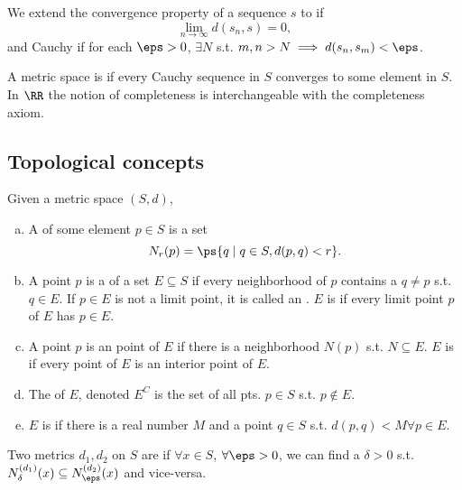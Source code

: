 \documentclass[11pt]{scrartcl}
\numberwithin{equation}{section}
\begin{document}
\begin{definition}
    We extend the convergence property of a sequence $s$ to if 
    \[ \lim_{n\rightarrow \infty}{d(s_n,s)} = 0,\]
    and Cauchy if for each $\eps>0$, $\exists N$ s.t. $m,n > N \implies 
    d(s_n,s_m) < \eps$.
\end{definition}

\begin{definition}
    A metric space is  if every Cauchy sequence in $S$
    converges to some element in $S$. In $\RR$ the notion of 
    completeness is interchangeable with the completeness axiom.
\end{definition}

\subsection{Topological concepts}
\begin{definition}
    Given a metric space $(S,d)$,
    \begin{enumerate}[a.]
        \item A  of some element $p\in S$ is a 
        set \[ N_r(p) = \ps{q\mid q \in S, d(p,q)<r}. \] 
        \item A point $p$ is a  of a set $E\subseteq S$ 
        if every neighborhood of $p$ contains a $q\neq p$ s.t.
        $q \in E$. If $p\in E$ is not a limit point, it is called an
        . $E$ is  if every limit point $p$ of $E$ 
        has $p \in E$.
        \item A point $p$ is an  point of $E$ if
        there is a neighborhood $N(p)$ s.t. $N\subseteq E$. $E$ is  if every point of $E$ is an 
        interior point of $E$.
        \item The  of $E$, denoted $E^C$ is the 
        set of all pts. $p \in S$ s.t. $p\notin E$.
        \item $E$ is  if there is a real number 
        $M$ and a point $q \in S$ s.t. $d(p,q)< M\forall p \in E$.
    \end{enumerate}
\end{definition}

\begin{definition}
    Two metrics $d_1, d_2$ on $S$ are  if 
    $\forall x \in S$,
    $\forall \eps > 0$, we can find a $\delta >0$ s.t. 
    $N_{\delta}^{(d_1)}(x) \subseteq N_{\eps}^{(d_2)}(x)$ and vice-versa.
\end{definition}
\end{document}
